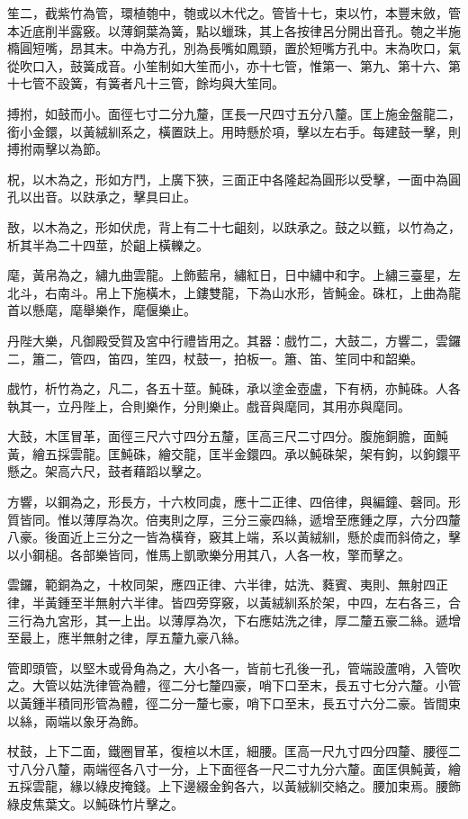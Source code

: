 \begin{pinyinscope}
笙二，截紫竹為管，環植匏中，匏或以木代之。管皆十七，束以竹，本豐末斂，管本近底削半露竅。以薄銅葉為簧，點以蠟珠，其上各按律呂分開出音孔。匏之半施橢圓短嘴，昂其末。中為方孔，別為長嘴如鳳頸，置於短嘴方孔中。末為吹口，氣從吹口入，鼓簧成音。小笙制如大笙而小，亦十七管，惟第一、第九、第十六、第十七管不設簧，有簧者凡十三管，餘均與大笙同。

搏拊，如鼓而小。面徑七寸二分九釐，匡長一尺四寸五分八釐。匡上施金盤龍二，銜小金鐶，以黃絨紃系之，橫置趺上。用時懸於項，擊以左右手。每建鼓一擊，則搏拊兩擊以為節。

柷，以木為之，形如方鬥，上廣下狹，三面正中各隆起為圓形以受擊，一面中為圓孔以出音。以趺承之，擊具曰止。

敔，以木為之，形如伏虎，背上有二十七齟刻，以趺承之。鼓之以籈，以竹為之，析其半為二十四莖，於齟上橫轢之。

麾，黃帛為之，繡九曲雲龍。上飾藍帛，繡紅日，日中繡中和字。上繡三臺星，左北斗，右南斗。帛上下施橫木，上鏤雙龍，下為山水形，皆魨金。硃杠，上曲為龍首以懸麾，麾舉樂作，麾偃樂止。

丹陛大樂，凡御殿受賀及宮中行禮皆用之。其器：戲竹二，大鼓二，方響二，雲鑼二，簫二，管四，笛四，笙四，杖鼓一，拍板一。簫、笛、笙同中和韶樂。

戲竹，析竹為之，凡二，各五十莖。魨硃，承以塗金壺盧，下有柄，亦魨硃。人各執其一，立丹陛上，合則樂作，分則樂止。戲音與麾同，其用亦與麾同。

大鼓，木匡冒革，面徑三尺六寸四分五釐，匡高三尺二寸四分。腹施銅膽，面魨黃，繪五採雲龍。匡魨硃，繪交龍，匡半金鐶四。承以魨硃架，架有鉤，以鉤鐶平懸之。架高六尺，鼓者藉蹈以擊之。

方響，以鋼為之，形長方，十六枚同虡，應十二正律、四倍律，與編鐘、磬同。形質皆同。惟以薄厚為次。倍夷則之厚，三分三豪四絲，遞增至應鍾之厚，六分四釐八豪。後面近上三分之一皆為橫脊，竅其上端，系以黃絨紃，懸於虡而斜倚之，擊以小鋼槌。各部樂皆同，惟馬上凱歌樂分用其八，人各一枚，擎而擊之。

雲鑼，範銅為之，十枚同架，應四正律、六半律，姑洗、蕤賓、夷則、無射四正律，半黃鍾至半無射六半律。皆四旁穿竅，以黃絨紃系於架，中四，左右各三，合三行為九宮形，其一上出。以薄厚為次，下右應姑洗之律，厚二釐五豪二絲。遞增至最上，應半無射之律，厚五釐九豪八絲。

管即頭管，以堅木或骨角為之，大小各一，皆前七孔後一孔，管端設蘆哨，入管吹之。大管以姑洗律管為體，徑二分七釐四豪，哨下口至末，長五寸七分六釐。小管以黃鍾半積同形管為體，徑二分一釐七豪，哨下口至末，長五寸六分二豪。皆間束以絲，兩端以象牙為飾。

杖鼓，上下二面，鐵圈冒革，復楦以木匡，細腰。匡高一尺九寸四分四釐、腰徑二寸八分八釐，兩端徑各八寸一分，上下面徑各一尺二寸九分六釐。面匡俱魨黃，繪五採雲龍，緣以綠皮掩錢。上下邊綴金鉤各六，以黃絨紃交絡之。腰加束焉。腰飾綠皮焦葉文。以魨硃竹片擊之。


\end{pinyinscope}
